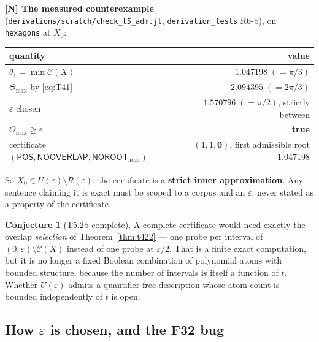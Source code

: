\documentclass[11pt,a4paper]{article}
\theoremstyle{definition}
\newtheorem{conjecture}[theorem]{Conjecture}
\newcommand{\Tmax}{\Theta_{\max}}
\newcommand{\file}[1]{\texttt{\small #1}}
\newcommand{\POS}{\textsf{POS}}
\newcommand{\NOOV}{\textsf{NOOVERLAP}}
\newcommand{\NOROOT}{\textsf{NOROOT}}
\begin{document}
\textbf{[N] The measured counterexample} (\file{derivations/scratch/check\_t5\_adm.jl},
\file{derivation\_tests} R6-b), on \file{hexagons} at $X_0$:

\begin{center}
\small
\begin{tabular}{@{}lr@{}}
\toprule
quantity & value \\
\midrule
$\theta_1=\min\mathcal{C}(X)$ & $1.047198\;(=\pi/3)$ \\
$\Tmax$ by \eqref{eq:T41} & $2.094395\;(=2\pi/3)$ \\
$\varepsilon$ chosen & $1.570796\;(=\pi/2)$, strictly between \\
$\Tmax\ge\varepsilon$ & \textbf{true} \\
certificate $(\POS,\NOOV,\NOROOT_{\mathrm{adm}})$ & $(1,1,\mathbf{0})$, first admissible root $1.047198$ \\
\bottomrule
\end{tabular}
\end{center}

\noindent So $X_0\in U(\varepsilon)\setminus R(\varepsilon)$: the certificate is a
\textbf{strict inner approximation}. Any sentence claiming it is exact must be scoped to a
corpus and an $\varepsilon$, never stated as a property of the certificate.

\begin{conjecture}[T5.2b-complete]
A complete certificate would need exactly the overlap \emph{selection} of
Theorem~\ref{thm:t422} --- one probe per interval of $(0,\varepsilon)\setminus\mathcal{C}(X)$
instead of one probe at $\varepsilon/2$. That is a finite exact computation, but it is no
longer a fixed Boolean combination of polynomial atoms with bounded structure, because the
number of intervals is itself a function of $t$. Whether $U(\varepsilon)$ admits a
quantifier-free description whose atom count is bounded independently of $t$ is open.
\end{conjecture}

\subsection{How \texorpdfstring{$\varepsilon$}{epsilon} is chosen, and the F32 bug}
\end{document}
